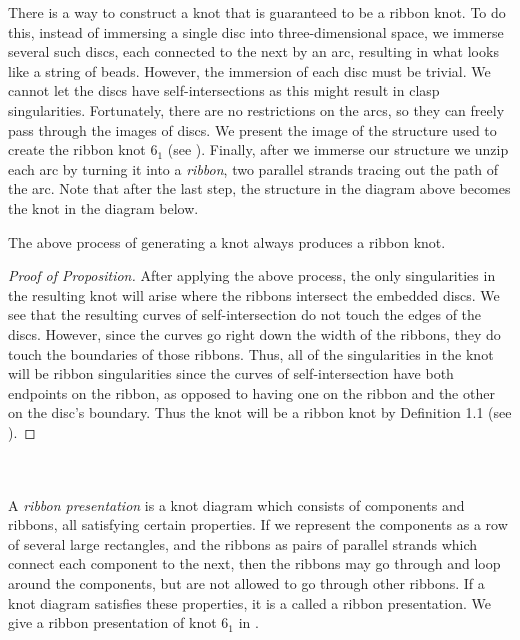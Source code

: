 \documentclass{ws-jktr}
\begin{document}
There is a way to construct a knot that is guaranteed to be a ribbon knot.
To do this, instead of immersing a single disc into three-dimensional space, we
immerse several such discs, each connected to the next by an arc, resulting in
what looks like a string of beads.
However, the immersion of each disc must be trivial.
We cannot let the discs have self-intersections as this might result in clasp
singularities.
Fortunately, there are no restrictions on the arcs, so they can freely pass
through the images of discs.
We present the image of the structure used to create the ribbon knot $6_1$ (see
\figImmersion).
Finally, after we immerse our structure we unzip each arc by turning it into a
\textit{ribbon}, two parallel strands tracing out the path of the arc.
Note that after the last step, the structure in the diagram above becomes the
knot in the diagram below.

\begin{proposition}
The above process of generating a knot always produces a ribbon knot.
\end{proposition}

\begin{proof}[Proof of Proposition]
After applying the above process, the only singularities in the resulting knot
will arise where the ribbons intersect the embedded discs.
We see that the resulting curves of self-intersection do not touch the edges of
the discs.
However, since the curves go right down the width of the ribbons, they do touch
the boundaries of those ribbons.
Thus, all of the singularities in the knot will be ribbon singularities since
the curves of self-intersection have both endpoints on the ribbon, as opposed to
having one on the ribbon and the other on the disc's boundary.
Thus the knot will be a ribbon knot by Definition 1.1 (see \figSingularities).
\end{proof}

\\\\

A \textit{ribbon presentation} is a knot diagram which consists of components
and ribbons, all satisfying certain properties.
If we represent the components as a row of several large rectangles, and the
ribbons as pairs of parallel strands which connect each component to the next,
then the ribbons may go through and loop around the components, but are not
allowed to go through other ribbons.
If a knot diagram satisfies these properties, it is a called a ribbon
presentation.
We give a ribbon presentation of knot $6_1$ in \figPresentation.
\end{document}
